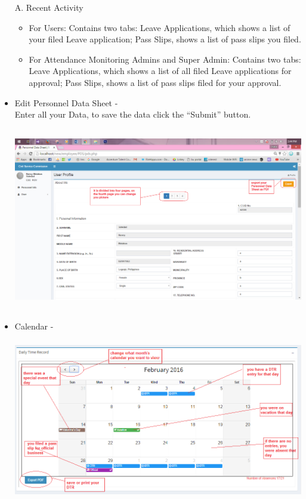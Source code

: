 \begin{itemize}
	\item[A.] Recent Activity
	\begin{itemize}
		\item For Users: Contains two tabs: Leave Applications, which shows a list of your filed Leave application; Pass Slips, shows a list of pass slips you filed.
		\item For Attendance Monitoring Admins and Super Admin: Contains two tabs: Leave Applications, which shows a list of all filed Leave applications for approval; Pass Slips, shows a list of pass slips filed for your approval.
	\end{itemize}
	\item Edit Personnel Data Sheet - \\ Enter all your Data, to save the data click the “Submit” button.\\
	\begin{center}
		\includegraphics[width=14cm,height=8cm]{image/editPDS.png}
	\end{center} 
	\item Calendar -
	\begin{center}
		\includegraphics[width=14cm,height=7cm]{image/calendar.png}

\end{center}
\end{itemize}
